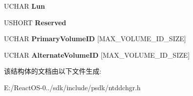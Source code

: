 \begin{DoxyCompactItemize}
U\+C\+H\+AR {\bfseries Lun}
\item 
\mbox{\label{struct___c_h_a_n_g_e_r___e_l_e_m_e_n_t___s_t_a_t_u_s_a89f86d95125460278ddf696e14d5faa0}} 
U\+S\+H\+O\+RT {\bfseries Reserved}
\item 
\mbox{\label{struct___c_h_a_n_g_e_r___e_l_e_m_e_n_t___s_t_a_t_u_s_af64f1468eaaa120fb02708ecf8e89622}} 
U\+C\+H\+AR {\bfseries Primary\+Volume\+ID} \mbox{[}M\+A\+X\+\_\+\+V\+O\+L\+U\+M\+E\+\_\+\+I\+D\+\_\+\+S\+I\+ZE\mbox{]}
\item 
\mbox{\label{struct___c_h_a_n_g_e_r___e_l_e_m_e_n_t___s_t_a_t_u_s_a11e376130c10d98bbcad111c54b8d1d9}} 
U\+C\+H\+AR {\bfseries Alternate\+Volume\+ID} \mbox{[}M\+A\+X\+\_\+\+V\+O\+L\+U\+M\+E\+\_\+\+I\+D\+\_\+\+S\+I\+ZE\mbox{]}
\end{DoxyCompactItemize}


该结构体的文档由以下文件生成\+:\begin{DoxyCompactItemize}
\item 
E\+:/\+React\+O\+S-\/0../sdk/include/psdk/ntddchgr.\+h\end{DoxyCompactItemize}
